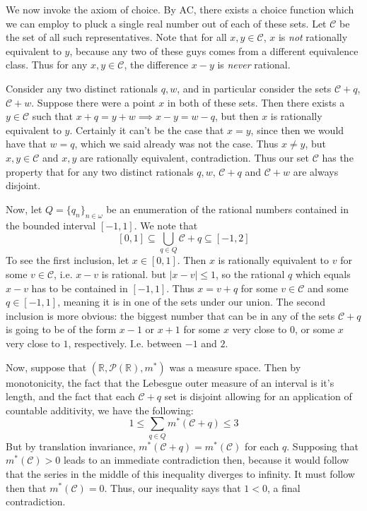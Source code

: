 \documentclass{article}
\theoremstyle{definition}
\theoremstyle{plain}
\theoremstyle{theorem}
\begin{document}
We now invoke the axiom of choice. By AC, there exists a choice function which we can employ to pluck a single real number out of each of these sets. Let $\mathcal{C}$ be the set of all such representatives. Note that for all $x,y \in \mathcal{C}$, $x$ is \textit{not} rationally equivalent to $y$, because any two of these guys comes from a different equivalence class. Thus for any $x,y \in \mathcal{C}$, the difference $x-y$ is \textit{never} rational. 
\par Consider any two distinct rationals $q,w$, and in particular consider the sets $\mathcal{C}+q$, $\mathcal{C}+w$. Suppose there were a point $x$ in both of these sets. Then there exists a $y \in \mathcal{C}$ such that $x+q=y+w \implies x-y = w-q$, but then $x$ is rationally equivalent to $y$. Certainly it can't be the case that $x=y$, since then we would have that $w=q$, which we said already was not the case. Thus $x\neq y$, but $x,y \in \mathcal{C}$ and $x,y$ are rationally equivalent, contradiction. Thus our set $\mathcal{C}$ has the property that for any two distinct rationals $q,w$, $\mathcal{C}+q$ and $\mathcal{C}+w$ are always disjoint. \par
Now, let $Q=\{q_n\}_{n \in \omega}$ be an enumeration of the rational numbers contained in the bounded interval $[-1,1]$. We note that
\[ [0,1] \subseteq \bigcup_{q \in Q} \mathcal{C}+q \subseteq [-1,2] \]
To see the first inclusion, let $x \in [0,1]$. Then $x$ is rationally equivalent to $v$ for some $v \in \mathcal{C}$, i.e. $x-v$ is rational. but $|x-v| \leq 1$, so the rational $q$ which equals $x-v$ has to be contained in $[-1,1]$. Thus $x = v+q$ for some $v \in \mathcal{C}$ and some $q \in [-1,1]$, meaning it is in one of the sets under our union. The second inclusion is more obvious: the biggest number that can be in any of the sets $\mathcal{C}+q$ is going to be of the form $x-1$ or $x+1$ for some $x$ very close to $0$, or some $x$ very close to $1$, respectively. I.e. between $-1$ and $2$. \par
Now, suppose that $(\mathbb{R},\mathcal{P}(\mathbb{R}),m^*)$ was a measure space. Then by monotonicity, the fact that the Lebesgue outer measure of an interval is it's length, and the fact that each $\mathcal{C}+q$ set is disjoint allowing for an application of countable additivity, we have the following:
\[ 1 \leq \sum_{q \in Q} m^*(\mathcal{C}+q) \leq 3 \]
But by translation invariance, $m^*(\mathcal{C}+q) = m^*(\mathcal{C})$ for each $q$. Supposing that $m^*(\mathcal{C}) > 0$ leads to an immediate contradiction then, because it would follow that the series in the middle of this inequality diverges to infinity. It must follow then that $m^*(\mathcal{C})=0$. Thus, our inequality says that $1<0$, a final contradiction. 
\end{document}
